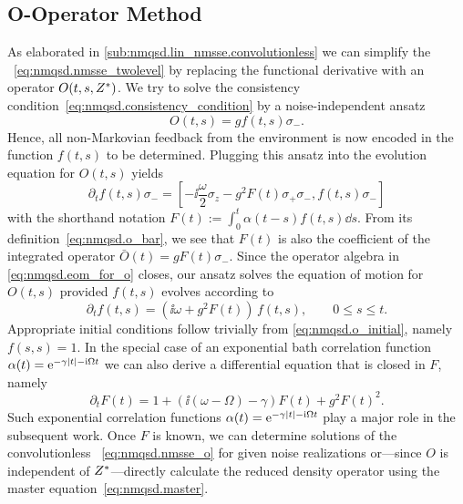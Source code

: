 \subsection{O-Operator Method}
\label{sub:nmqsd.two_level.o}
%

As elaborated in \autoref{sub:nmqsd.lin_nmsse.convolutionless} we can simplify the \NMSSE~\ref{eq:nmqsd.nmsse_twolevel} by replacing the functional derivative with an operator $O(t, s, {Z}^*)$.
We try to solve the consistency condition~\ref{eq:nmqsd.consistency_condition} by a noise-independent ansatz \cite{DiGiSt98_nmqsd}
\begin{equation}
  O(t, s) = g f(t, s) \sigma_-.
  \label{eq:nmqsd.o_ansatz}
\end{equation}
Hence, all non-Markovian feedback from the environment is now encoded in the function $f(t, s)$ to be determined.
Plugging this ansatz into the evolution equation for $O(t,s)$ yields
\begin{equation}
  \partial_t f(t, s) \sigma_- = \left[-\ii \frac{\omega}{2} \sigma_z - g^2 F(t) \sigma_+\sigma_-, f(t, s) \sigma_-\right]
  \label{eq:nmqsd.eom_for_o}
\end{equation}
with the shorthand notation $F(t) := \int_0^t \alpha(t-s) f(t, s) \dd s$.
From its definition~\ref{eq:nmqsd.o_bar}, we see that $F(t)$ is also the coefficient of the integrated operator $\bar O(t) = g F(t) \sigma_-$.
Since the operator algebra in \autoref{eq:nmqsd.eom_for_o} closes, our ansatz solves the equation of motion for $O(t,s)$ provided $f(t,s)$ evolves according to
\begin{equation*}
  \partial_t f(t, s) = \left(\ii \omega + g^2 F(t)\right) \, f(t, s), \qquad 0 \le s \le t.
\end{equation*}
Appropriate initial conditions follow trivially from \autoref{eq:nmqsd.o_initial}, namely $f(s, s) = 1$.
In the special case of an exponential bath correlation function $\alpha(t) = \exp[-\gamma\abs{t} - \ii\Omega t]$ we can also derive a differential equation that is closed in $F$, namely
\begin{equation}
  \partial_t F(t) = 1 + (\ii (\omega - \Omega) - \gamma) F(t) + g^2 F(t)^2.
  \label{eq:nmqsd.twolevel_f}
\end{equation}
Such exponential correlation functions $\alpha(t) = \exp[-\gamma\abs{t} - \ii\Omega t]$ play a major role in the subsequent work.
Once $F$ is known, we can determine solutions of the convolutionless \NMSSE~\ref{eq:nmqsd.nmsse_o} for given noise realizations or---since $O$ is independent of ${Z}^*$---directly calculate the reduced density operator using the master equation~\ref{eq:nmqsd.master}.

